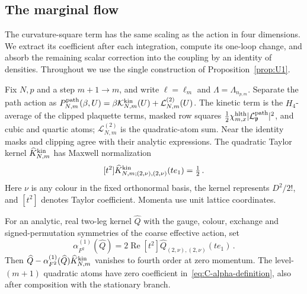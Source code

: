 \subsection{The marginal flow}\label{sec:partII-C-marginal}

The curvature-square term has the same scaling as the action in four dimensions. We extract its coefficient after each integration, compute its one-loop change, and absorb the remaining scalar correction into the coupling by an identity of densities. Throughout we use the single construction of Proposition~\ref{prop:U1}.

Fix $N,p$ and a step $m+1\to m$, and write $\ell=\ell_m$ and $\Lambda=\Lambda_{n_{p,m}}$. Separate the path action as $P^{\mathrm{path}}_{N,m}(\beta,U)=\beta\mathcal K^{\rm kin}_{N,m}(U)+\mathcal L^{(2)}_{N,m}(U)$. The kinetic term is the $H_4$-average of the clipped plaquette terms, masked row squares $\tfrac12\chi^{\rm hlth}_{m,x}|\mathcal L_{\mathfrak p}^{\rm path}|^2$, and cubic and quartic atoms; $\mathcal L^{(2)}_{N,m}$ is the quadratic-atom sum. Near the identity masks and clipping agree with their analytic expressions. The quadratic Taylor kernel $\widehat K^{\rm kin}_{N,m}$ has Maxwell normalization
\begin{equation}\label{eq:C-maxwell-normalization}
 [t^2]\widehat K^{\rm kin}_{N,m;(2,\nu),(2,\nu)}(te_1)=\tfrac12\,.
\end{equation}
Here $\nu$ is any colour in the fixed orthonormal basis, the kernel represents $D^2/2!$, and $[t^2]$ denotes Taylor coefficient. Momenta use unit lattice coordinates.

\begin{lemma}\label{lem:C-maxwell-extraction}
For an analytic, real two-leg kernel $\widehat Q$ with the gauge, colour, exchange and signed-permutation symmetries of the coarse effective action, set
\begin{equation}\label{eq:C-alpha-definition}
 \alpha^{(1)}_{F^2}(\widehat Q)=2\operatorname{Re}[t^2]\widehat Q_{(2,\nu),(2,\nu)}(te_1)\,.
\end{equation}
Then $\widehat Q-\alpha^{(1)}_{F^2}(\widehat Q)\widehat K^{\rm kin}_{N,m}$ vanishes to fourth order at zero momentum. The level-$(m+1)$ quadratic atoms have zero coefficient in~\eqref{eq:C-alpha-definition}, also after composition with the stationary branch.
\end{lemma}

